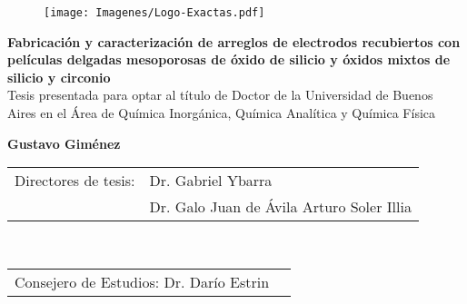 \begin{titlepage}


		\begin{figure}[t!]
		\centering
		\texttt{[image: Imagenes/Logo-Exactas.pdf]}%
	 	\end{figure}

		\begin{center}
		\vspace*{1cm}
		\end{center}

		

	 	\begin{center}
	 	\large{\bfseries{Fabricación y caracterización de arreglos de electrodos recubiertos con películas delgadas mesoporosas de óxido de silicio y óxidos mixtos de silicio y circonio}} \\ \vspace*{0.5cm}
	 	\normalsize{Tesis presentada para optar al título de Doctor de la Universidad de Buenos Aires en el Área de Química Inorgánica, Química Analítica y Química Física} \\ \vspace*{1.2cm}
	 	
	 	\Large{\bfseries{Gustavo Giménez}} \\ 
	 	\end{center}
		
		\vspace*{2cm}

		\setlength\tabcolsep{1.5pt}
		\noindent\begin{tabular}{@{}ll}
		Directores de tesis:&Dr. Gabriel Ybarra\\  %
		 &Dr. Galo Juan de Ávila Arturo Soler Illia\\						%
		\end{tabular} \\
		\noindent\begin{tabular}{@{}ll}
		Consejero de Estudios: Dr. Darío Estrin \\ %
		\end{tabular} \\ 


\end{titlepage}
